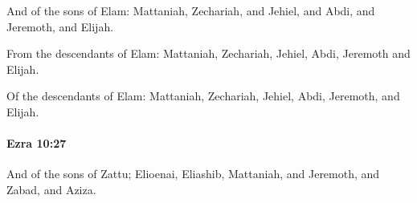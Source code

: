			\begin{versebox}
					\item[BHS] 
					\item[LXX] 
					\item[ASV] And of the sons of Elam: Mattaniah, Zechariah, and Jehiel, and Abdi, and Jeremoth, and Elijah.
					\item[NIV] From the descendants of Elam: Mattaniah, Zechariah, Jehiel, Abdi, Jeremoth and Elijah.
					\item[NRSV] Of the descendants of Elam: Mattaniah, Zechariah, Jehiel, Abdi, Jeremoth, and Elijah.
			\end{versebox}

		\paragraph{Ezra 10:27} %
			\label{EZRA-10-27}

			And of the sons of Zattu; Elioenai, Eliashib, Mattaniah, and Jeremoth, and Zabad, and Aziza.

